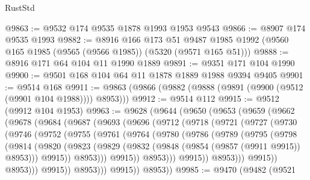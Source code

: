 \begin{lexlean}{RustStd}
\begin{coremodule}
@9863 := @9532 @174 @9535 @1878 @1993 @1953 @9543
@9866 := @8907 @174 @9535 @1993
@9882 := @8916
    @166
    @173
    @51
    @9487
    @1985
    @1992
    (@9560 @165 @1985 (@9565 (@9566 @1985)) (@5320 (@9571 @165 @51)))
@9888 := @8916 @171 @64 @104 @11 @1990 @1889
@9891 := @9351 @171 @104 @1990
@9900 := @9501 @168 @104 @64 @11 @1878 @1889 @1988 @9394 @9405
@9901 := @9514 @168
@9911 := @9863 (@9866 (@9882 (@9888 (@9891 (@9900 (@9512 (@9901 @104 @1988)))) @8953)))
@9912 := @9514 @112
@9915 := @9512 (@9912 @104 @1953)
@9963 := @9628
    (@9644
      (@9650
        (@9653
          (@9659
            (@9662
              (@9678
                (@9684
                  (@9687
                    (@9693
                      (@9696
                        (@9712
                          (@9718
                            (@9721
                              (@9727
                                (@9730
                                  (@9746
                                    (@9752
                                      (@9755
                                        (@9761
                                          (@9764
                                            (@9780
                                              (@9786
                                                (@9789
                                                  (@9795
                                                    (@9798
                                                      (@9814
                                                        (@9820
                                                          (@9823
                                                            (@9829
                                                              (@9832
                                                                (@9848
                                                                  (@9854
                                                                    (@9857 (@9911 @9915))
                                                                    @8953)))
                                                              @9915))
                                                          @8953)))
                                                    @9915))
                                                @8953)))
                                          @9915))
                                      @8953)))
                                @9915))
                            @8953)))
                      @9915))
                  @8953)))
            @9915))
        @8953))
@9985 := @9470
    (@9482
      (@9521

\end{coremodule}
\end{lexlean}
